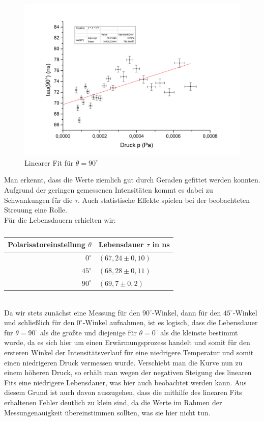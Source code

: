 \begin{figure}[h]
\begin{center}
\includegraphics[scale=0.5]{Bilder/erwaermung_90}
\caption{Linearer Fit für $\theta=90^{\circ}$}
\end{center}
\end{figure}
\clearpage
Man erkennt, dass die Werte ziemlich gut durch Geraden gefittet werden konnten. Aufgrund der geringen gemessenen Intensitäten kommt es dabei zu Schwankungen für die $\tau$. Auch statistische Effekte spielen bei der beobachteten Streuung eine Rolle. \\
Für die Lebensdauern erhielten wir:\\
\begin{table}[htbp]
\begin{center}
\caption{}
\begin{tabular}{|r|l|}
\hline
\multicolumn{1}{|l|}{Polarisatoreinstellung $\theta$} & Lebensdauer $\tau$ in ns \\ \hline
$0^{\circ}$ & $(67,24\pm0,10)$ \\ \hline
$45^{\circ}$ & $(68,28\pm0,11)$ \\ \hline
$90^{\circ}$ & $(69,7\pm0,2)$ \\ \hline
\end{tabular}
\end{center}
\label{}
\end{table}
~\\
Da wir stets zunächst eine Messung für den $90^{\circ}$-Winkel, dann für den $45^{\circ}$-Winkel und schließlich für den $0^{\circ}$-Winkel aufnahmen, ist es logisch, dass die Lebensdauer für $\theta=90^{\circ}$ als die größte und diejenige für $\theta=0^{\circ}$ als die kleinste bestimmt wurde, da es sich hier um einen Erwärmungsprozess handelt und somit für den ersteren Winkel der Intensitätsverlauf für eine niedrigere Temperatur und somit einen niedrigeren Druck vermessen wurde. Verschiebt man die Kurve nun zu einem höheren Druck, so erhält man wegen der negativen Steigung des linearen Fits eine niedrigere Lebensdauer, was hier auch beobachtet werden kann. Aus diesem Grund ist auch davon auszugehen, dass die mithilfe des linearen Fits erhaltenen Fehler deutlich zu klein sind, da die Werte im Rahmen der Messungenauigkeit übereinstimmen sollten, was sie hier nicht tun.
